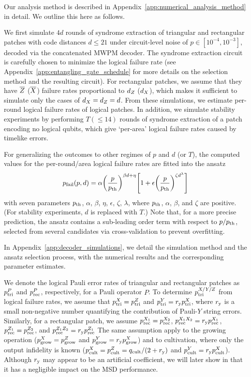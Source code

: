 \documentclass[
 prx,
 reprint,
 superscriptaddress,
 longbibliography,
 dvipsnames
]{revtex4-2}
\begin{document}
Our analysis method is described in Appendix~\ref{app:numerical_analysis_method} in detail.
We outline this here as follows.

We first simulate $4d$ rounds of syndrome extraction of triangular and rectangular patches with code distances $d \leq 21$ under circuit-level noise of $p \in [10^{-4}, 10^{-3}]$, decoded via the concatenated MWPM decoder.
The syndrome extraction circuit is carefully chosen to minimize the logical failure rate (see Appendix~\ref{app:entangling_gate_schedule} for more details on the selection method and the resulting circuit).
For rectangular patches, we assume that they have $\overline{Z}$ ($\overline{X}$) failure rates proportional to ${d_Z}$ (${d_X}$), which makes it sufficient to simulate only the cases of ${d_X}={d_Z}=d$.
From these simulations, we estimate per-round logical failure rates of logical patches.
In addition, we simulate stability experiments \cite{gidney2022stability} by performing $T (\leq 14)$ rounds of syndrome extraction of a patch encoding no logical qubits, which give `per-area' logical failure rates caused by timelike errors.

For generalizing the outcomes to other regimes of $p$ and $d$ (or $T$), the computed values for the per-round/area logical failure rates are fitted into the ansatz
\begin{align}
    p_{\mathrm{fail}}(p, d) = \alpha \qty(\frac{p}{p_{\mathrm{th}}})^{\beta d + \eta}\qty[1 + \epsilon \qty(\frac{p}{p_{\mathrm{th}}})^{\zeta d^\lambda}]
    \label{eq:ansatz}
\end{align}
with seven parameters $p_{\mathrm{th}}$, $\alpha$, $\beta$, $\eta$, $\epsilon$, $\zeta$, $\lambda$, where $p_{\mathrm{th}}$, $\alpha$, $\beta$, and $\zeta$ are positive.
(For stability experiments, $d$ is replaced with $T$.)
Note that, for a more precise prediction, the ansatz contains a sub-leading order term with respect to $p/p_{\mathrm{th}}$, selected from several candidates via cross-validation to prevent overfitting.

In Appendix~\ref{app:decoder_simulations}, we detail the simulation method and the ansatz selection process, with the numerical results and the corresponding parameter estimates.

We denote the logical Pauli error rates of triangular and rectangular patches as $p_{\mathrm{tri}}^{P}$ and $p_{\mathrm{rec}}^{P}$, respectively, for a Pauli operator $P$.
To determine $p_{\mathrm{tri}}^{X/Y/Z}$ from logical failure rates, we assume that $p_{\mathrm{tri}}^{X} = p_{\mathrm{tri}}^{Z}$ and $p_{\mathrm{tri}}^{Y} = r_{\mathrm{y}} p_{\mathrm{tri}}^{X}$, where $r_{\mathrm{y}}$ is a small non-negative number quantifying the contribution of Pauli-$Y$ string errors.
Similarly, for a rectangular patch, we assume $p_{\mathrm{rec}}^{X_1} = p_{\mathrm{rec}}^{X_2}$, $p_{\mathrm{rec}}^{X_1 X_2} = r_{\mathrm{y}} p_{\mathrm{rec}}^{X_1}$, $p_{\mathrm{rec}}^{Z_1} = p_{\mathrm{rec}}^{Z_2}$, and $p_{\mathrm{rec}}^{Z_1 Z_2} = r_{\mathrm{y}} p_{\mathrm{rec}}^{Z_1}$
The same assumption apply to the growing operation ($p_{\mathrm{grow}}^{X} = p_{\mathrm{grow}}^{Z}$ and $p_{\mathrm{grow}}^{Y} = r_{\mathrm{y}} p_{\mathrm{grow}}^{X}$) and to cultivation, where only the output infidelity is known ($p_{\mathrm{cult}}^{X} = p_{\mathrm{cult}}^{Z} = q_{\mathrm{cult}}/(2 + r_{\mathrm{y}})$ and $p_{\mathrm{cult}}^{Y} = r_{\mathrm{y}} p_{\mathrm{cult}}^{X}$).
Although $r_{\mathrm{y}}$ may appear to be an artificial coefficient, we will later show in that it has a negligible impact on the MSD performance.
\end{document}
